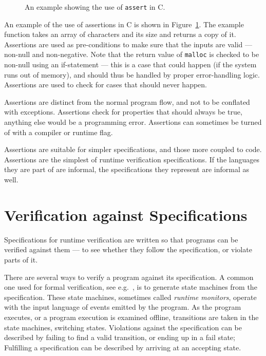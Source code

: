 \documentclass[a4paper,11pt]{kth-mag}
\theoremstyle{definition}
\begin{document}
\begin{figure}[h!]
	\begin{center}
	\begin{minipage}{0.7\textwidth}
    \lstset{language=C}
		
	\end{minipage}
	\end{center}
  \caption{An example showing the use of \texttt{assert} in C.}
	\label{figure-c-assert-example}
\end{figure}

An example of the use of assertions in C is shown in
Figure~\ref{figure-c-assert-example}. The example function takes an array of
characters and its size and returns a copy of it. Assertions are used as
pre-conditions to make sure that the inputs are valid --- non-null and
non-negative. Note that the return value of \texttt{malloc} is checked to be
non-null using an if-statement --- this is a case that could happen (if the
system runs out of memory), and should thus be handled by proper error-handling
logic. Assertions are used to check for cases that should never happen.

Assertions are distinct from the normal program flow, and not to be conflated
with exceptions. Assertions check for properties that should always be true,
anything else would be a programming error. Assertions can sometimes be turned
of with a compiler or runtime flag.

Assertions are suitable for simpler specifications, and those more coupled to
code. Assertions are the simplest of runtime verification specifications. If
the languages they are part of are informal, the specifications they represent
are informal as well.



\section{Verification against Specifications} \label{section-verification}

Specifications for runtime verification are written so that programs can be
verified against them --- to see whether they follow the specification, or
violate parts of it.

There are several ways to verify a program against its specification. A common
one used for formal verification, see e.g.\ \cite{bauer06monitoring,
bodden05efficientrv, jalili07rverl, barringer03eagle}, is to generate state
machines from the specification. These state machines, sometimes called
\textit{runtime monitors}, operate with the input language of events emitted by
the program. As the program executes, or a program execution is examined
offline, transitions are taken in the state machines, switching states.
Violations against the specification can be described by failing to find a
valid transition, or ending up in a fail state; Fulfilling a specification can
be described by arriving at an accepting state.
\end{document}
